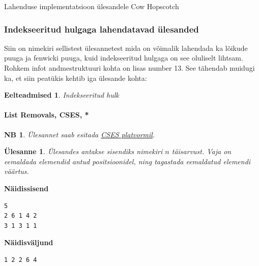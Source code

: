 \documentclass{trkut}
\newtheorem*{prereq}{Eelteadmised}
\newtheorem*{extra}{NB}
\newtheorem*{Text}{Ülesanne}
\begin{document}
 \begin{kk}[H]%
    \caption{Lahenduse implementatsioon ülesandele Cow Hopscotch}%
    \label{EMaxx}%
    \end{kk}
    
\subsubsection{Indekseeritud hulgaga lahendatavad ülesanded}
Siin on nimekiri sellistest ülesannetest mida on võimalik lahendada ka lõikude puuga ja fenwicki puuga, kuid indekseeritud hulgaga on see oluliselt lihtsam.
Rohkem infot andmestruktuuri kohta on lisas number 13.
See tähendab muidugi ka, et siin peatükis kehtib iga ülesande kohta:
\begin{prereq}
Indekseeritud hulk
\end{prereq}


\paragraph{List Removals, CSES, *}
\begin{extra}
Ülesannet saab esitada \href{https://cses.fi/problemset/task/1749}{CSES platvormil}.
\end{extra}
\begin{Text}
Ülesandes antakse sisendiks nimekiri $n$ täisarvust. Vaja on eemaldada elemendid antud positsioonidel, ning tagastada eemaldatud elemendi väärtus.

\parencite{list}
\end{Text}



\textbf{Näidissisend}

\begin{verbatim}
5
2 6 1 4 2
3 1 3 1 1
\end{verbatim}

\textbf{Näidisväljund}

\begin{verbatim}
1 2 2 6 4
\end{verbatim}
\end{document}

